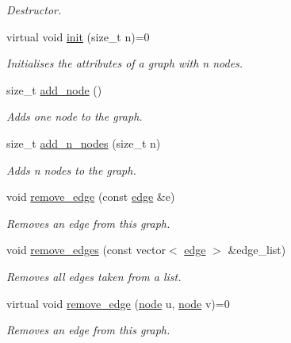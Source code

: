 \begin{DoxyCompactItemize}
\begin{DoxyCompactList}\small\item\em Destructor. \end{DoxyCompactList}\item 
virtual void \hyperlink{classlgraph_1_1utils_1_1xxgraph_a2ac8b3e71fa0550248c692a19ea04d0d}{init} (size\-\_\-t n)=0
\begin{DoxyCompactList}\small\item\em Initialises the attributes of a graph with {\itshape n} nodes. \end{DoxyCompactList}\item 
size\-\_\-t \hyperlink{classlgraph_1_1utils_1_1xxgraph_af41baf2c098e872731ad646aeec1b382}{add\-\_\-node} ()
\begin{DoxyCompactList}\small\item\em Adds one node to the graph. \end{DoxyCompactList}\item 
size\-\_\-t \hyperlink{classlgraph_1_1utils_1_1xxgraph_ae1283d13858ea06a6999626a01d12e4b}{add\-\_\-n\-\_\-nodes} (size\-\_\-t n)
\begin{DoxyCompactList}\small\item\em Adds {\itshape n} nodes to the graph. \end{DoxyCompactList}\item 
void \hyperlink{classlgraph_1_1utils_1_1xxgraph_af826c05492f237d7727f88ebab033001}{remove\-\_\-edge} (const \hyperlink{namespacelgraph_1_1utils_a6510284ce1b1ae5dc97ce5d2de426e10}{edge} \&e)
\begin{DoxyCompactList}\small\item\em Removes an edge from this graph. \end{DoxyCompactList}\item 
void \hyperlink{classlgraph_1_1utils_1_1xxgraph_a747da8a567d232081199499f23821926}{remove\-\_\-edges} (const vector$<$ \hyperlink{namespacelgraph_1_1utils_a6510284ce1b1ae5dc97ce5d2de426e10}{edge} $>$ \&edge\-\_\-list)
\begin{DoxyCompactList}\small\item\em Removes all edges taken from a list. \end{DoxyCompactList}\item 
virtual void \hyperlink{classlgraph_1_1utils_1_1xxgraph_a722693838fb7cfbd5b78c293fffc2413}{remove\-\_\-edge} (\hyperlink{namespacelgraph_1_1utils_a7bd66ede3805ef121bc2835bd48de0cf}{node} u, \hyperlink{namespacelgraph_1_1utils_a7bd66ede3805ef121bc2835bd48de0cf}{node} v)=0
\begin{DoxyCompactList}\small\item\em Removes an edge from this graph. \end{DoxyCompactList}\item 

\end{DoxyCompactItemize}
